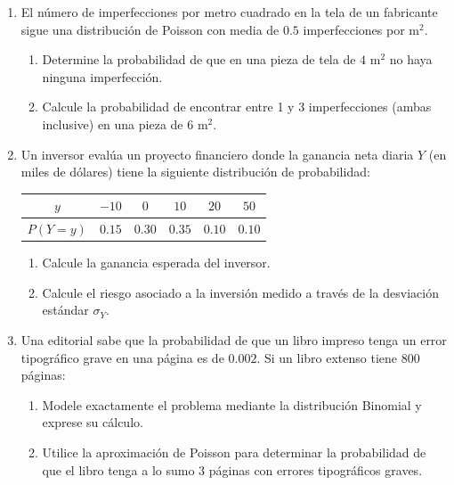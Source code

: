 \documentclass[letterpaper,12pt,spanish]{article}
\begin{document}
\begin{enumerate}[label=\textbf{\arabic*.}]
    \vspace{0.3cm}

    \item El número de imperfecciones por metro cuadrado en la tela de un fabricante sigue una distribución de Poisson con media de $0.5$ imperfecciones por $\text{m}^2$.
    \begin{enumerate}[label=\alph*)]
        \item Determine la probabilidad de que en una pieza de tela de $4\text{ m}^2$ no haya ninguna imperfección.
        \item Calcule la probabilidad de encontrar entre 1 y 3 imperfecciones (ambas inclusive) en una pieza de $6\text{ m}^2$.
    \end{enumerate}

    \vspace{0.3cm}

    \item Un inversor evalúa un proyecto financiero donde la ganancia neta diaria $Y$ (en miles de dólares) tiene la siguiente distribución de probabilidad:
    \begin{center}
    \begin{tabular}{cccccc}
    \toprule
    $y$ & $-10$ & $0$ & $10$ & $20$ & $50$ \\
    \midrule
    $P(Y = y)$ & $0.15$ & $0.30$ & $0.35$ & $0.10$ & $0.10$ \\
    \bottomrule
    \end{tabular}
    \end{center}
    \begin{enumerate}[label=\alph*)]
        \item Calcule la ganancia esperada del inversor.
        \item Calcule el riesgo asociado a la inversión medido a través de la desviación estándar $\sigma_Y$.
    \end{enumerate}

    \vspace{0.3cm}

    \item Una editorial sabe que la probabilidad de que un libro impreso tenga un error tipográfico grave en una página es de $0.002$. Si un libro extenso tiene $800$ páginas:
    \begin{enumerate}[label=\alph*)]
        \item Modele exactamente el problema mediante la distribución Binomial y exprese su cálculo.
        \item Utilice la aproximación de Poisson para determinar la probabilidad de que el libro tenga a lo sumo 3 páginas con errores tipográficos graves.
    \end{enumerate}


\end{enumerate}
\end{document}
